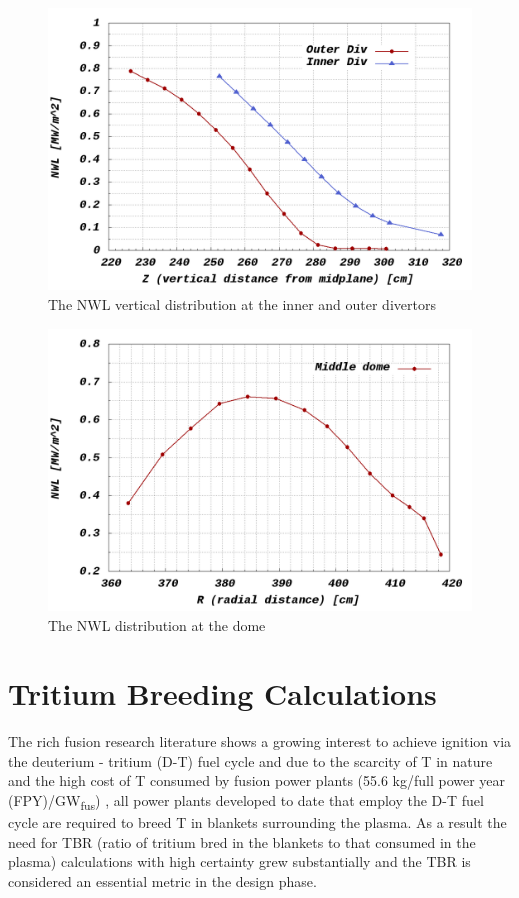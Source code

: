 \documentclass[12pt, letterpaper]{elsarticle}
\begin{document}
\begin{figure}[h!]
  \centering
  \includegraphics[scale=0.3]{../plots/NWL_2divs.png}
  \caption{The NWL vertical distribution at the inner and outer divertors}
  \label{fig:NWL 2Divs}
\end{figure}
\begin{figure}[h!]
	\centering
	\includegraphics[scale=0.3]{../plots/NWL_div.png}
	\caption{The NWL distribution at the dome}
	\label{fig:NWL Dome}
\end{figure}

\section{Tritium Breeding Calculations} \label{Tritium Breeding Calculations}
The rich fusion research literature shows a growing interest to achieve ignition via the deuterium - tritium (D-T) fuel cycle and due to the scarcity of T in nature and the high cost of T consumed by fusion power plants (55.6 kg/full power year (FPY)/GW\textsubscript{fus}) \cite{ref_3}, all power plants developed to date that employ the D-T fuel cycle are required to breed T in blankets surrounding the plasma. As a result the need for TBR (ratio of tritium bred in the blankets to that consumed in the plasma) calculations with high certainty grew substantially and the TBR is considered an essential metric in the design phase.\vspace{5mm}
\end{document}

